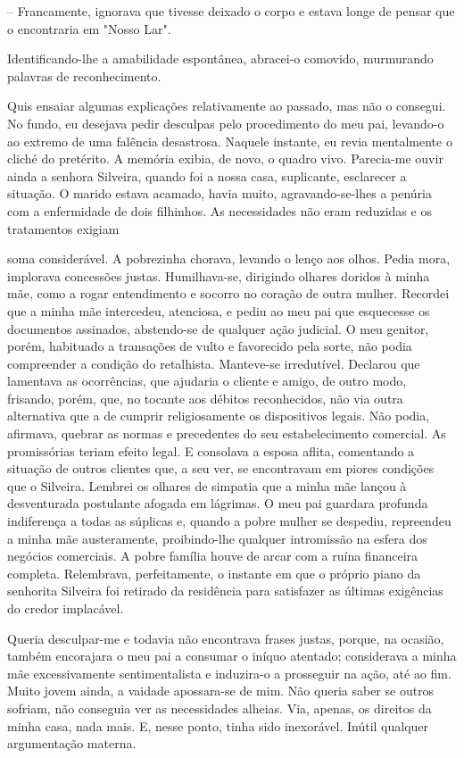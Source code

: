 \documentclass[portuguese,12pt,a4paper]{scrbook}
\begin{document}
	– Francamente, ignorava que tivesse deixado o corpo e estava longe de pensar que o encontraria em "Nosso Lar".
	
	Identificando-lhe a amabilidade espontânea, abracei-o comovido, murmurando palavras de reconhecimento.
	
	Quis ensaiar algumas explicações relativamente ao passado, mas não o consegui. No fundo, eu desejava pedir desculpas pelo procedimento do meu pai, levando-o ao extremo de uma falência desastrosa. Naquele instante, eu revia mentalmente o cliché do pretérito. A memória exibia, de novo, o quadro vivo. Parecia-me ouvir ainda a senhora Silveira, quando foi a nossa casa, suplicante, esclarecer a situação. O marido estava acamado, havia muito, agravando-se-lhes a penúria com a enfermidade de dois filhinhos. As necessidades não eram reduzidas e os tratamentos exigiam
	
	
	soma considerável. A pobrezinha chorava, levando o lenço aos olhos. Pedia mora, implorava concessões justas. Humilhava-se, dirigindo olhares doridos à minha mãe, como a rogar entendimento e socorro no coração de outra mulher. Recordei que a minha mãe intercedeu, atenciosa, e pediu ao meu pai que esquecesse os documentos assinados, abstendo-se de qualquer ação judicial. O meu genitor, porém, habituado a transações de vulto e favorecido pela sorte, não podia compreender a condição do retalhista. Manteve-se irredutível. Declarou que lamentava as ocorrências, que ajudaria o cliente e amigo, de outro modo, frisando, porém, que, no tocante aos débitos reconhecidos, não via outra alternativa que a de cumprir religiosamente os dispositivos legais. Não podia, afirmava, quebrar as normas e precedentes do seu estabelecimento comercial. As promissórias teriam efeito legal. E consolava a esposa aflita, comentando a situação de outros clientes que, a seu ver, se encontravam em piores condições que o Silveira. Lembrei os olhares de simpatia que a minha mãe lançou à desventurada postulante afogada em lágrimas. O meu pai guardara profunda indiferença a todas as súplicas e, quando a pobre mulher se despediu, repreendeu a minha mãe austeramente, proibindo-lhe qualquer intromissão na esfera dos negócios comerciais. A pobre família houve de arcar com a ruína financeira completa. Relembrava, perfeitamente, o instante em que o próprio piano da senhorita Silveira foi retirado da residência para satisfazer as últimas exigências do credor implacável.
	
	Queria desculpar-me e todavia não encontrava frases justas, porque, na ocasião, também encorajara o meu pai a consumar o iníquo atentado; considerava a minha mãe excessivamente sentimentalista e induzira-o a prosseguir na ação, até ao fim. Muito jovem ainda, a vaidade apossara-se de mim. Não queria saber se outros sofriam, não conseguia ver as necessidades alheias. Via, apenas, os direitos da minha casa, nada mais. E, nesse ponto, tinha sido inexorável. Inútil qualquer argumentação materna.
	
\end{document}
